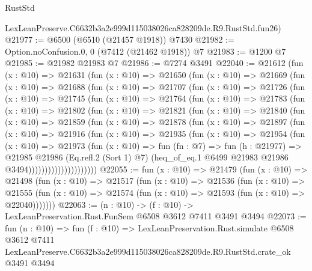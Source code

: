 \begin{lexlean}{RustStd}
\begin{coremodule}
    LexLeanPreserve.C6632b3a2e999d115038026ca828209de.R9.RustStd.fun26)
@21977 := @6500 (@6510 (@21457 @1918)) @7430
@21982 := Option.noConfusion.{0, 0} (@7412 (@21462 @1918)) @7
@21983 := @1200 @7
@21985 := @21982 @21983 @7
@21986 := @7274 @3491
@22040 := @21612
    (fun (x : @10) =>
    @21631
      (fun (x : @10) =>
      @21650
        (fun (x : @10) =>
        @21669
          (fun (x : @10) =>
          @21688
            (fun (x : @10) =>
            @21707
              (fun (x : @10) =>
              @21726
                (fun (x : @10) =>
                @21745
                  (fun (x : @10) =>
                  @21764
                    (fun (x : @10) =>
                    @21783
                      (fun (x : @10) =>
                      @21802
                        (fun (x : @10) =>
                        @21821
                          (fun (x : @10) =>
                          @21840
                            (fun (x : @10) =>
                            @21859
                              (fun (x : @10) =>
                              @21878
                                (fun (x : @10) =>
                                @21897
                                  (fun (x : @10) =>
                                  @21916
                                    (fun (x : @10) =>
                                    @21935
                                      (fun (x : @10) =>
                                      @21954
                                        (fun (x : @10) =>
                                        @21973
                                          (fun (x : @10) =>
                                          fun (fn : @7) =>
                                          fun (h : @21977) =>
                                          @21985
                                            @21986
                                            (Eq.refl.{2} (Sort 1) @7)
                                            (heq_of_eq.{1}
                                              @6499
                                              @21983
                                              @21986
                                              @3494)))))))))))))))))))))
@22055 := fun (x : @10) =>
  @21479
    (fun (x : @10) =>
    @21498
      (fun (x : @10) =>
      @21517
        (fun (x : @10) =>
        @21536
          (fun (x : @10) =>
          @21555 (fun (x : @10) => @21574 (fun (x : @10) => @21593 (fun (x : @10) => @22040)))))))
@22063 := (n : @10) -> (f : @10) -> LexLeanPreservation.Rust.FunSem @6508 @3612 @7411 @3491 @3494
@22073 := fun (n : @10) =>
  fun (f : @10) =>
  LexLeanPreservation.Rust.simulate
    @6508
    @3612
    @7411
    LexLeanPreserve.C6632b3a2e999d115038026ca828209de.R9.RustStd.crate_ok
    @3491
    @3494
\end{coremodule}
\end{lexlean}

